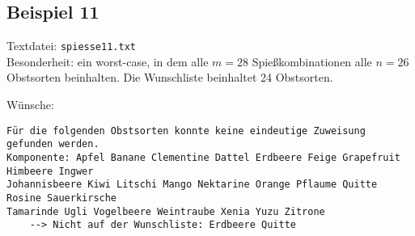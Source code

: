 \subsection{Beispiel 11}\label{example:11}
Textdatei: \texttt{spiesse11.txt}\\
Besonderheit: ein worst-case, in dem alle $m = 28$ Spießkombinationen alle $n = 26$ Obstsorten beinhalten. Die Wunschliste beinhaltet 24 Obstsorten.
\vspace{0.25cm}

\noindent
Wünsche: \\
\vspace{0.25cm}

\noindent
{}
\begin{verbatim}
Für die folgenden Obstsorten konnte keine eindeutige Zuweisung gefunden werden.
Komponente: Apfel Banane Clementine Dattel Erdbeere Feige Grapefruit Himbeere Ingwer
Johannisbeere Kiwi Litschi Mango Nektarine Orange Pflaume Quitte Rosine Sauerkirsche
Tamarinde Ugli Vogelbeere Weintraube Xenia Yuzu Zitrone 
	--> Nicht auf der Wunschliste: Erdbeere Quitte
\end{verbatim}
